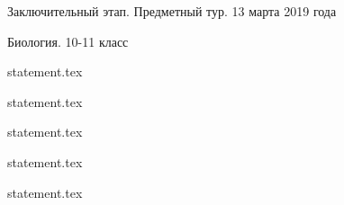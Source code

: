 \documentclass[a4paper,11pt, oneside]{book}
\begin{document}
\vspace{-3mm}
\vspace{-5mm}

\normalsize

\begin{center}
    Заключительный этап. Предметный тур. 13 марта 2019 года
    
    Биология. 10-11 класс
\end{center}

\parindent=0cm

{statement.tex}

{statement.tex}

{statement.tex}

\newpage

{statement.tex}

\newpage

{statement.tex}
\end{document}
